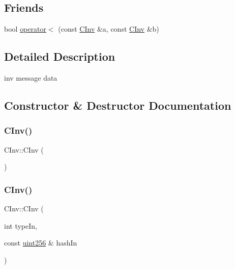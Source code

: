 \subsection*{Friends}
\begin{DoxyCompactItemize}
\item 
bool \mbox{\hyperlink{class_c_inv_a2684809000d3a0523769ad7585ace197}{operator$<$}} (const \mbox{\hyperlink{class_c_inv}{C\+Inv}} \&a, const \mbox{\hyperlink{class_c_inv}{C\+Inv}} \&b)
\end{DoxyCompactItemize}


\subsection{Detailed Description}
inv message data 

\subsection{Constructor \& Destructor Documentation}
\mbox{\label{class_c_inv_a831d208e5e1b142e36a89999b81c2298}} 
\subsubsection{\texorpdfstring{C\+Inv()}{CInv()}\hspace{0.1cm}{\footnotesize\ttfamily [1/3]}}
{\footnotesize\ttfamily C\+Inv\+::\+C\+Inv (\begin{DoxyParamCaption}{ }\end{DoxyParamCaption})}

\mbox{\label{class_c_inv_a4c6e02df7b10378f876ecc76c6b50301}} 
\subsubsection{\texorpdfstring{C\+Inv()}{CInv()}\hspace{0.1cm}{\footnotesize\ttfamily [2/3]}}
{\footnotesize\ttfamily C\+Inv\+::\+C\+Inv (\begin{DoxyParamCaption}\item[{int}]{type\+In,  }\item[{const \mbox{\hyperlink{classuint256}{uint256}} \&}]{hash\+In }\end{DoxyParamCaption})}

